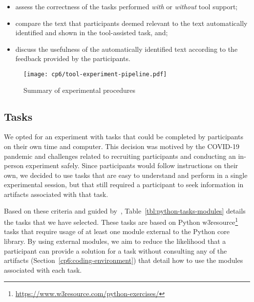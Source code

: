 \begin{itemize}
    \item assess the correctness of the tasks performed \textit{with} or \textit{without} tool support;
    \item compare  the text that participants deemed relevant to the text automatically identified
    and shown in the tool-assisted task, and;
    \item discuss the usefulness of the automatically identified text according to the feedback provided by the participants.
\end{itemize}
 





\begin{figure}
\centering
\texttt{[image: cp6/tool-experiment-pipeline.pdf]}
\caption{Summary of experimental procedures}
\label{fig:tool-experiment-procedures}
\end{figure}





\subsection{Tasks}
\label{cp6:tasks}


We opted for an experiment with tasks that could be completed by participants on their own time and computer.
This decision was motived by the COVID-19 pandemic and challenges related to recruiting participants and conducting an in-person experiment safely\red{~\cite{}}. 
Since participants would follow instructions on their own, we decided to use tasks that are easy to understand and perform in a single experimental session, but that still required a participant  
to seek information in artifacts associated with that task.



Based on these criteria and guided by~\cite{thiselton2019},
Table~\ref{tbl:python-tasks-modules} details the tasks that we have selected. 
These tasks are based on 
Python w3resource\footnote{\url{https://www.w3resource.com/python-exercises/}} tasks
that require usage of at least one module external to the Python core library.
By using external modules, we aim to reduce the likelihood that a participant 
can provide a solution for a task without consulting any of the artifacts (Section~\ref{cp6:coding-environment})
that detail how to use the modules associated with each task. 



